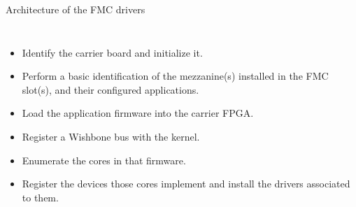 \documentclass[compress,red]{beamer}
\begin{document}
\begin{frame}{Architecture of the FMC drivers}
\begin{columns}[c]
\footnotesize
\begin{itemize}
\item<4-> Identify the carrier board and initialize it.
\item<5-> Perform a basic identification of the mezzanine(s) installed in
    the FMC slot(s), and their configured applications.
\item<8-> Load the application firmware into the carrier FPGA.
\item<9-> Register a Wishbone bus with the kernel.
\item<11-> Enumerate the cores in that firmware.
\item<12-> Register the devices those cores implement and install the drivers
    associated to them.
\end{itemize}
\end{columns}
\end{frame}
\end{document}
